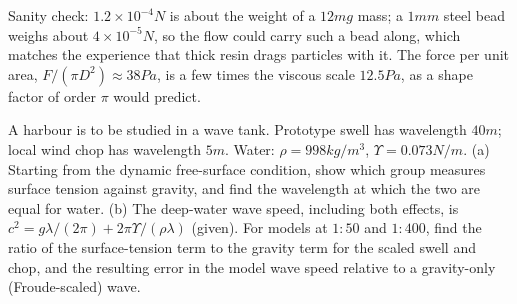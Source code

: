 Sanity check: $1.2\times10^{-4}\unit{N}$ is about the weight of a $12\unit{mg}$ mass; a $1\unit{mm}$ steel bead weighs about $4\times10^{-5}\unit{N}$, so the flow could carry such a bead along, which matches the experience that thick resin drags particles with it. The force per unit area, $F/(\pi D^2) \approx 38\unit{Pa}$, is a few times the viscous scale $12.5\unit{Pa}$, as a shape factor of order $\pi$ would predict.

\begin{example}
A harbour is to be studied in a wave tank. Prototype swell has wavelength $40\unit{m}$; local wind chop has wavelength $5\unit{m}$. Water: $\rho = 998\unit{kg/m^3}$, $\Upsilon = 0.073\unit{N/m}$.
(a) Starting from the dynamic free-surface condition, show which group measures surface tension against gravity, and find the wavelength at which the two are equal for water.
(b) The deep-water wave speed, including both effects, is $c^2 = g\lambda/(2\pi) + 2\pi\Upsilon/(\rho\lambda)$ (given). For models at $1{:}50$ and $1{:}400$, find the ratio of the surface-tension term to the gravity term for the scaled swell and chop, and the resulting error in the model wave speed relative to a gravity-only (Froude-scaled) wave.
\end{example}

